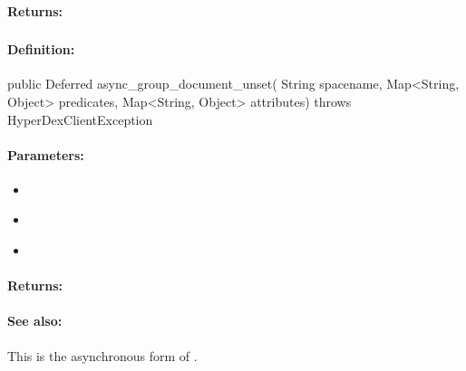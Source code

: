 \paragraph{Returns:}


\pagebreak
\subsubsection{}
\label{api:java:async_group_document_unset}


\paragraph{Definition:}
\begin{javacode}
public Deferred async_group_document_unset(
        String spacename,
        Map<String, Object> predicates,
        Map<String, Object> attributes) throws HyperDexClientException
\end{javacode}

\paragraph{Parameters:}
\begin{itemize}[noitemsep]
\item {}\\

\item {}\\

\item {}\\

\end{itemize}

\paragraph{Returns:}


\paragraph{See also:}  This is the asynchronous form of .

